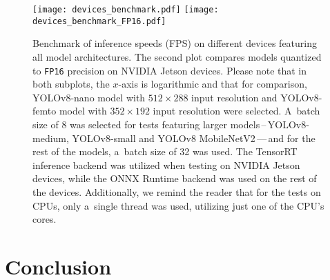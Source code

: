 \begin{figure}[H]
        \centering
        \texttt{[image: devices\_benchmark.pdf]}
        \texttt{[image: devices\_benchmark\_FP16.pdf]}
        \caption{Benchmark of inference speeds (FPS) on different devices
        featuring all model architectures. The second plot compares models
        quantized to \texttt{FP16} precision on NVIDIA Jetson devices. Please
        note that in both subplots, the $x$-axis is logarithmic and that for
        comparison, YOLOv8-nano model with $512 \times 288$ input resolution and
        YOLOv8-femto model with $352 \times 192$ input resolution were selected.
        A~batch size of 8 was selected for tests featuring larger
        models\,--\,YOLOv8-medium, YOLOv8-small and YOLOv8 MobileNetV2\,---\,and for
        the rest of the models, a~batch size of 32 was used. The TensorRT
        inference backend was utilized when testing on NVIDIA Jetson devices,
        while the ONNX Runtime backend was used on the rest of the devices.
        Additionally, we remind the reader that for the tests on CPUs, only
        a~single thread was used, utilizing just one of the CPU's cores.}
        \label{DevicesBenchmark}
\end{figure}







\chapter{Conclusion}




